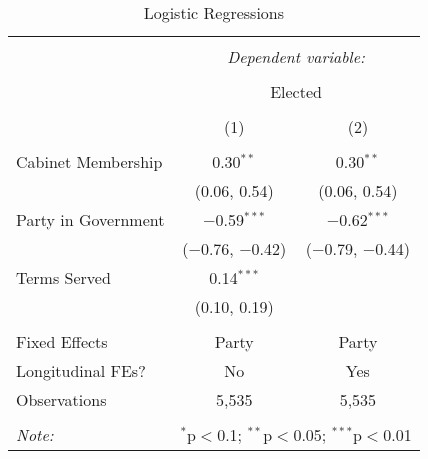 
\begin{table}[!htb] \centering 
  \caption{Logistic Regressions} 
  \label{} 
\begin{tabular}{@{\extracolsep{5pt}}lcc} 
\\[-1.8ex]\hline 
\hline \\[-1.8ex] 
 & \multicolumn{2}{c}{\textit{Dependent variable:}} \\ 
\cline{2-3} 
\\[-1.8ex] & \multicolumn{2}{c}{Elected} \\ 
\\[-1.8ex] & (1) & (2)\\ 
\hline \\[-1.8ex] 
 Cabinet Membership & 0.30$^{**}$ & 0.30$^{**}$ \\ 
  & (0.06, 0.54) & (0.06, 0.54) \\ 
  Party in Government & $-$0.59$^{***}$ & $-$0.62$^{***}$ \\ 
  & ($-$0.76, $-$0.42) & ($-$0.79, $-$0.44) \\ 
  Terms Served & 0.14$^{***}$ &  \\ 
  & (0.10, 0.19) &  \\ 
 \hline \\[-1.8ex] 
Fixed Effects & Party & Party \\ 
Longitudinal FEs? & No & Yes \\ 
Observations & 5,535 & 5,535 \\ 
\hline 
\hline \\[-1.8ex] 
\textit{Note:}  & \multicolumn{2}{r}{$^{*}$p$<$0.1; $^{**}$p$<$0.05; $^{***}$p$<$0.01} \\ 
\end{tabular} 
\end{table} 
